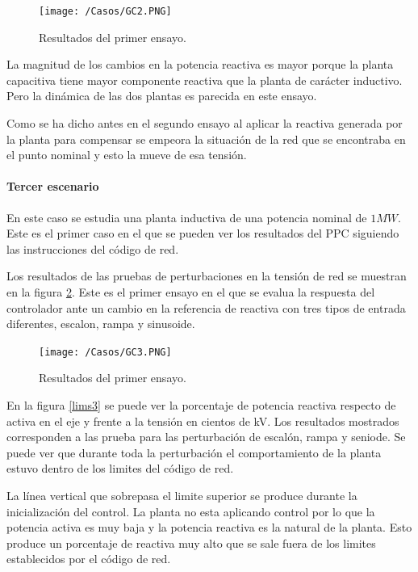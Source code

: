 \documentclass{book}
\begin{document}
\begin{figure}[h!]
\centering
\texttt{[image: /Casos/GC2.PNG]}
\caption{Resultados del primer ensayo. }
\label{GC2}
\end{figure} \par

La magnitud de los cambios en la potencia reactiva es mayor porque la planta capacitiva tiene mayor componente reactiva que la planta de car\'acter inductivo. Pero la din\'amica de las dos plantas es parecida en este ensayo. \par

Como se ha dicho antes en el segundo ensayo al aplicar  la reactiva generada por la planta para compensar se empeora la situaci\'on de la red que se encontraba en el punto nominal y esto la mueve de esa tensi\'on. \par

	\paragraph{Tercer escenario}

En este caso se estudia una planta inductiva de una potencia nominal de $1MW$. Este es el primer caso en el que se pueden ver los resultados del PPC siguiendo las instrucciones del c\'odigo de red. \par

Los resultados de las pruebas de perturbaciones en la tensi\'on de red se muestran en la figura \ref{GC3}. Este es el primer ensayo en el que se evalua la respuesta del controlador ante un cambio en la referencia de reactiva con tres tipos de entrada diferentes, escalon, rampa y sinusoide. \par

\begin{figure}[h!]
\centering
\texttt{[image: /Casos/GC3.PNG]}
\caption{Resultados del primer ensayo. }
\label{GC3}
\end{figure} \par

En la figura \ref{lims3} se puede ver la porcentaje de potencia reactiva respecto de activa en el eje y frente a la tensi\'on en cientos de kV. Los resultados mostrados corresponden a las prueba para las perturbaci\'on de escal\'on, rampa y seniode. Se puede ver que durante toda la perturbaci\'on el comportamiento de la planta estuvo dentro de los limites del c\'odigo de red. \par

La l\'inea vertical que sobrepasa el limite superior se produce durante la inicializaci\'on del control. La planta no esta aplicando control por lo que la potencia activa es muy baja y la potencia reactiva es la natural de la planta. Esto produce un porcentaje de reactiva muy alto que se sale fuera de los limites establecidos por el c\'odigo de red. \par  
\end{document}
